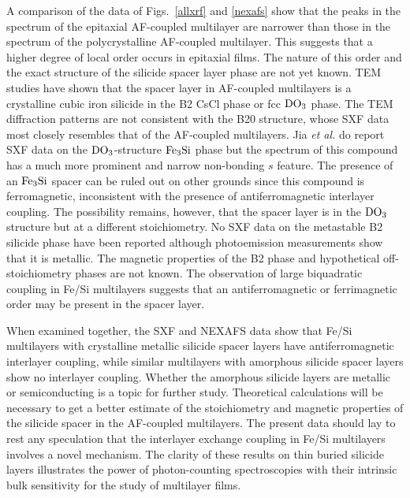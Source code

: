 A comparison of the data of Figs.~\ref{allxrf} and \ref{nexafs} show
that the peaks in the spectrum of the epitaxial AF-coupled multilayer
are narrower than those in the spectrum of the polycrystalline
AF-coupled multilayer.  This suggests that a higher degree of local
order occurs in epitaxial films.  The nature of this order and the
exact structure of the silicide spacer layer phase are not yet known.
TEM studies have shown that the spacer layer in AF-coupled multilayers
is a crystalline cubic iron silicide in the B2 CsCl phase or fcc $\rm
DO_3$ phase.\cite{fesiprb} The TEM diffraction patterns are not
consistent with the B20 structure, whose SXF data most closely
resembles that of the AF-coupled multilayers.  Jia {\it et al.} do
report SXF data on the $\rm DO_3$-structure $\rm Fe_3Si$ phase but the
spectrum of this compound has a much more prominent and narrow
non-bonding $s$ feature.\cite{jia} The presence of an $\rm Fe_3Si$
spacer can be ruled out on other grounds since this compound is
ferromagnetic, inconsistent with the presence of antiferromagnetic
interlayer coupling.  The possibility remains, however, that the
spacer layer is in the $\rm DO_3$ structure but at a different
stoichiometry.  No SXF data on the metastable B2 silicide phase have
been reported although photoemission measurements show that it is
metallic.\cite{vonkanel} The magnetic properties of the B2 phase and
hypothetical off-stoichiometry phases are not known.  The observation
of large biquadratic coupling in Fe/Si
multilayers\cite{fullerton2,michel} suggests that an antiferromagnetic
or ferrimagnetic order may be present in the spacer layer.

When examined together, the SXF and NEXAFS data show that Fe/Si
multilayers with crystalline metallic silicide spacer layers have
antiferromagnetic interlayer coupling, while similar multilayers with
amorphous silicide spacer layers show no interlayer coupling.  Whether
the amorphous silicide layers are metallic or semiconducting is a
topic for further study.  Theoretical calculations will be necessary
to get a better estimate of the stoichiometry and magnetic properties
of the silicide spacer in the AF-coupled multilayers.  The present
data should lay to rest any speculation that the interlayer exchange
coupling in Fe/Si multilayers involves a novel mechanism.  The clarity
of these results on thin buried silicide layers illustrates the power
of photon-counting spectroscopies with their intrinsic bulk
sensitivity for the study of multilayer films.


\bigskip

